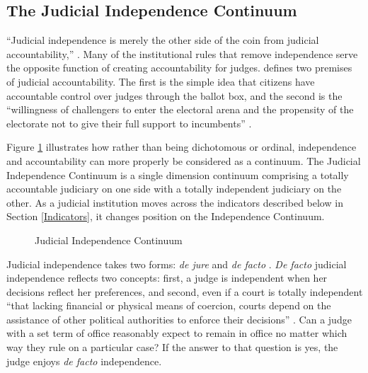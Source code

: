 \documentclass[12pt]{article}
\begin{document}
\subsection*{The Judicial Independence Continuum}
``Judicial independence is merely the other side of the coin from judicial accountability,'' \citep{Burbank2008}.  Many of the institutional rules that remove independence serve the opposite function of creating accountability for judges.  \citet{Hall2007} defines two premises of judicial accountability. The first is the simple idea that citizens have accountable control over judges through the ballot box, and the second is the ``willingness of challengers to enter the electoral arena and the propensity of the electorate not to give their full support to incumbents'' \citep[166]{Hall2007}.

Figure \ref{IndCon} illustrates how rather than being dichotomous or ordinal, independence and accountability can more properly be considered as a continuum.  The Judicial Independence Continuum is a single dimension continuum comprising a totally accountable judiciary on one side with a totally independent judiciary on the other.  As a judicial institution moves across the indicators described below in Section \ref{Indicators}, it changes position on the Independence Continuum. 

\begin{figure}[tb]\centering\caption{Judicial Independence Continuum}\label{IndCon}
\end{figure}

Judicial independence takes two forms: \textit{de jure} and \textit{de facto} \citep{Feld2003,Rios2014, Rosenberg1991,Voeten2008}.  \textit{De facto} judicial independence reflects two concepts: first, a judge is independent when her decisions reflect her preferences, and second, even if a court is totally independent ``that lacking financial or physical means of coercion, courts depend on the assistance of other political authorities to enforce their decisions'' \citep[4]{Rios2014}. Can a judge with a set term of office reasonably expect to remain in office no matter which way they rule on a particular case? If the answer to that question is yes, the judge enjoys \textit{de facto} independence. 
\end{document}
